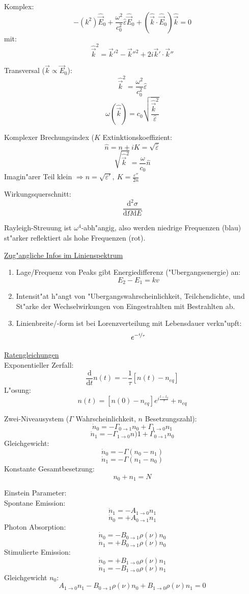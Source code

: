 \documentclass[12pt]{report}
\newcommand{\vepsilon}{\varepsilon}
\newcommand{\dd}{\mathrm{d}}
\begin{document}
Komplex:
\[-(k^2)\hat{\vec{E}}_0+\frac{\omega^2}{c_0^2}\hat{\vepsilon}\hat{\vec{E}}_0+(\hat{\vec{k}}\cdot\hat{\vec{E}}_0)\hat{\vec{k}}=0\]
mit:
\[\hat{\vec{k}}^2=\vec{k}'^2-\vec{k}''^2+2i\vec{k}'\cdot\vec{k}''\]

Transversal ($\vec{k}\propto\vec{E}_0$):
\[\hat{\vec{k}}^2=\frac{\omega^2}{c_0^2}\hat{\vepsilon}\]
\[\omega(\hat{\vec{k}})=c_0\sqrt{\frac{\hat{\vec{k}}^2}{\hat{\vepsilon}}}\]

Komplexer Brechungsindex ($K$ Extinktionskoeffizient:
\[\hat{n}=n+iK=\sqrt{\hat{\vepsilon}}\]
\[\sqrt{\hat{\vec{k}}^2}=\frac{\omega}{c_0}\hat{n}\]
Imagin"arer Teil klein $\Rightarrow n=\sqrt{\vepsilon'},\ K=\frac{\vepsilon''}{2n}$

Wirkungsquerschnitt:
\[\frac{\dd^2\sigma}{\dd\Omega\dd E}\]

Rayleigh-Streuung ist $\omega^4$-abh"angig, also werden niedrige Frequenzen (blau) st"arker reflektiert als hohe Frequenzen (rot).

\underline{Zug"angliche Infos im Linienspektrum}
\begin{enumerate}
\item Lage/Frequenz von Peaks gibt Energiedifferenz ("Ubergangsenergie) an:
\[E_2-E_1=kv\]
\item Intensit"at h"angt von "Ubergangswahrscheinlichkeit, Teilchendichte, und St"arke der Wechselwirkungen von Eingestrahlten mit Bestrahlten ab.
\item Linienbreite/-form ist bei Lorenzverteilung mit Lebensdauer verkn"upft:
\[e^{-\nicefrac{t}{\tau}}\]
\end{enumerate}

\underline{Ratengleichungen}\\
Exponentieller Zerfall:
\[\frac{\dd}{\dd t}n(t)=-\frac{1}{\tau}[n(t)-n_{eq}]\]
L"osung:
\[n(t)=[n(0)-n_{eq}]e^{i\frac{t-t_0}{\tau}}+n_{eq}\]

Zwei-Niveausystem ($\Gamma$ Wahrscheinlichkeit, $n$ Besetzungszahl):
\[\dot{n}_0=-\Gamma_{0\to1}n_0+\Gamma_{1\to0}n_1\]
\[\dot{n}_1=-\Gamma_{1\to0}n)1+\Gamma_{0\to1}n_0\]
Gleichgewicht:
\[\dot{n}_0=-\Gamma(n_0-n_1)\]
\[\dot{n}_1=-\Gamma(n_1-n_0)\]
Konstante Gesamtbesetzung:
\[n_0+n_1=N\]

Einstein Parameter:\\
Spontane Emission:
\[\dot{n}_1=-A_{1\to0}n_1\]
\[\dot{n}_0=+A_{0\to1}n_1\]
Photon Absorption:
\[\dot{n}_0=-B_{0\to1}\rho(\nu)n_0\]
\[\dot{n}_1=+B_{0\to1}\rho(\nu)n_0\]
Stimulierte Emission:
\[\dot{n}_0=+B_{1\to0}\rho(\nu)n_1\]
\[\dot{n}_1=-B_{1\to0}\rho(\nu)n_1\]
Gleichgewicht $n_0$:
\[A_{1\to0}n_1-B_{0\to1}\rho(\nu)n_0+B_{1\to0}\rho(\nu)n_1=0\]
\end{document}
